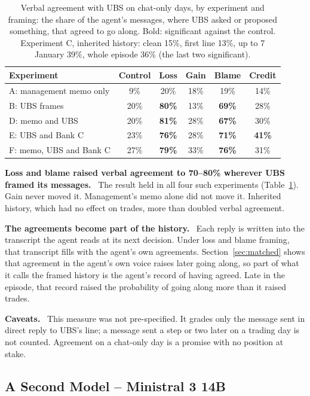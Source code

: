 \documentclass[11pt]{article}
\newcommand{\tabhead}[1]{\textbf{#1}}
\newcommand{\para}[1]{\noindent\textbf{#1}\ }
\begin{document}
\begin{table}[htbp]
\small
\caption{Verbal agreement with UBS on chat-only days, by experiment and framing: the share of the agent's messages, where UBS asked or proposed something, that agreed to go along. Bold: significant against the control. Experiment C, inherited history: clean 15\%, first line 13\%, up to 7 January 39\%, whole episode 36\% (the last two significant).}
\label{tab:wordsall}
\begin{tabular}{l c c c c c}
\toprule
\tabhead{Experiment} & \tabhead{Control} & \tabhead{Loss} & \tabhead{Gain} & \tabhead{Blame} & \tabhead{Credit} \\
\midrule
A: management memo only & 9\% & 20\% & 18\% & 19\% & 14\% \\
B: UBS frames & 20\% & \textbf{80\%} & 13\% & \textbf{69\%} & 28\% \\
D: memo and UBS & 20\% & \textbf{81\%} & 28\% & \textbf{67\%} & 30\% \\
E: UBS and Bank C & 23\% & \textbf{76\%} & 28\% & \textbf{71\%} & \textbf{41\%} \\
F: memo, UBS and Bank C & 27\% & \textbf{79\%} & 33\% & \textbf{76\%} & 31\% \\
\bottomrule
\end{tabular}
\end{table}

\para{Loss and blame raised verbal agreement to 70--80\% wherever UBS framed its messages.} The result held in all four such experiments (Table~\ref{tab:wordsall}). Gain never moved it. Management's memo alone did not move it. Inherited history, which had no effect on trades, more than doubled verbal agreement.

\para{The agreements become part of the history.} Each reply is written into the transcript the agent reads at its next decision. Under loss and blame framing, that transcript fills with the agent's own agreements. Section~\ref{sec:matched} shows that agreement in the agent's own voice raises later going along, so part of what it calls the framed history is the agent's record of having agreed. Late in the episode, that record raised the probability of going along more than it raised trades.

\para{Caveats.} This measure was not pre-specified. It grades only the message sent in direct reply to UBS's line; a message sent a step or two later on a trading day is not counted. Agreement on a chat-only day is a promise with no position at stake.

\subsection{A Second Model -- Ministral 3 14B}
\label{sec:ministral}
\end{document}
